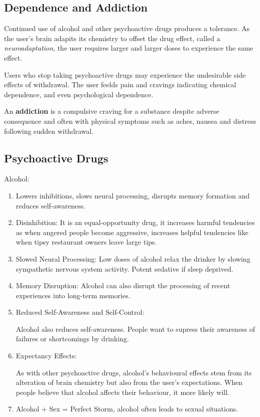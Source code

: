 \documentclass[12pt]{article}
\begin{document}
\subsection*{Dependence and Addiction}
Continued use of alcohol and other psychoactive drugs produces a tolerance. As the user's brain adapits its chemistry to offset the drug effect, called a \textit{neuroadaptation}, the user requires larger and larger doses to experience the same effect. 

Users who stop taking psychoactive drugs may experience the undesirable side effects of withdrawal. The user feelds pain and cravings indicating chemical dependence, and even psychological dependence. 

An \textbf{addiction} is a compulsive craving for a substance despite adverse consequence and often with physical symptoms such as aches, nausea and distress following sudden withdrawal. 

\subsection*{Psychoactive Drugs}
Alcohol:
\begin{enumerate}
\item Lowers inhibitions, slows neural processing, disrupts memory formation and reduces self-awareness. 

\item Disinhibition: It is an equal-opportunity drug, it increases harmful tendencies as when angered people become aggressive, increases helpful tendencies like when tipsy restaurant owners leave large tips.

\item Slowed Neural Processing: Low doses of alcohol relax the drinker by slowing sympathetic nervous system activity. Potent sedative if sleep deprived. 

\item Memory Disruption: Alcohol can also disrupt the processing of recent experiences into long-term memories. 

\item Reduced Self-Awareness and Self-Control:

Alcohol also reduces self-awareness. People want to supress their awareness of failures or shortcomings by drinking. 

\item Expectancy Effects:

As with other psychoactive drugs, alcohol's behavioural effects stem from its alteration of brain chemistry but also from the user's expectations. When people believe that alcohol affects their behaviour, it more likely will.

\item Alcohol + Sex = Perfect Storm, alcohol often leads to sexual situations. 

\end{enumerate}
\end{document}
